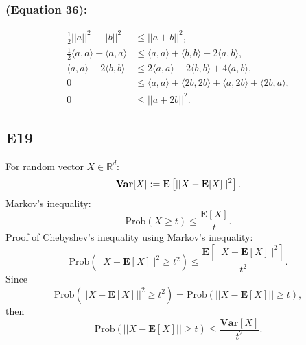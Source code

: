 \documentclass[12pt]{article}
\begin{document}
\subsubsection*{(Equation 36):}
\begin{equation}
    \begin{split}
        \frac{1}{2}||a||^2 - ||b||^2 &\leq ||a+b||^2,\\
        \frac{1}{2} \langle a, a\rangle - \langle a, a\rangle &\leq \langle a, a\rangle + \langle b, b\rangle + 2 \langle a, b\rangle, \\
        \langle a, a\rangle - 2 \langle b, b\rangle &\leq 2 \langle a, a\rangle + 2 \langle b, b\rangle + 4 \langle a, b\rangle, \\
        0 &\leq \langle a, a\rangle + \langle 2b, 2b\rangle + \langle a, 2b\rangle + \langle 2b, a\rangle, \\
        0 &\leq ||a+2b||^2.
    \end{split}
\end{equation}

\subsection*{E19}
For random vector $X \in \mathbb{R}^d$:
\begin{equation}
    \textbf{\text{Var}}[X] := \textbf{E}\left[ ||X - \textbf{E}[X]||^2\right].
    \label{eq:variance}
\end{equation}
Markov's inequality:
\begin{equation}
    \text{Prob}(X \geq t) \leq \frac{\textbf{E}[X]}{t}.
    \label{eq:markovineq}
\end{equation}
Proof of Chebyshev's inequality using Markov's inequality:
\begin{equation*}
    \text{Prob}(||X - \textbf{E}[X]||^2 \geq t^2) \leq \frac{\textbf{E}\left[ ||X - \textbf{E}[X]||^2\right]}{t^2}.
\end{equation*}
Since
\begin{equation}
    \text{Prob}(||X - \textbf{E}[X]||^2 \geq t^2) = \text{Prob}(||X - \textbf{E}[X]|| \geq t),
\end{equation}
then
\begin{equation}
    \text{Prob}(||X - \textbf{E}[X]|| \geq t) \leq \frac{\textbf{Var}[X]}{t^2}.
\end{equation}
\vspace{0.1cm}
\end{document}
